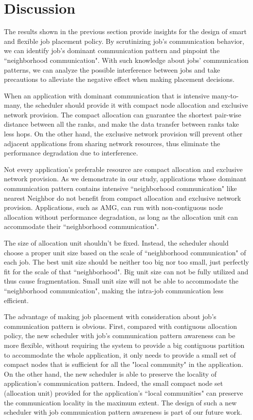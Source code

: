 
\section{Discussion}
\label{sec:discussion}

The results shown in the previous section provide insights 
for the design of smart and flexible job placement policy. 
By scrutinizing job's communication behavior, 
we can identify job's dominant communication pattern 
and pinpoint the ``neighborhood communication". 
With such knowledge about jobs' communication patterns, 
we can analyze the possible interference between jobs and 
take precautions to alleviate the negative effect when making placement decisions. 

When an application with dominant communication that is intensive many-to-many, 
the scheduler should provide it with compact node allocation and exclusive network provision. 
The compact allocation can guarantee the shortest pair-wise distance between all the ranks, 
and make the data transfer between ranks take less hops. 
On the other hand, 
the exclusive network provision will prevent other adjacent applications from sharing network resources, 
thus eliminate the performance degradation due to interference.

Not every application's preferable resource are compact allocation 
and exclusive network provision. 
As we demonstrate in our study, 
applications whose dominant communication pattern contains intensive 
``neighborhood communication" like nearest Neighbor do not benefit 
from compact allocation and exclusive network provision. 
Applications, such as AMG, can run with non-contiguous node 
allocation without performance degradation, 
as long as the allocation unit can accommodate their ``neighborhood communication".

The size of allocation unit shouldn't be fixed. 
Instead, the scheduler should choose a proper unit size 
based on the scale of ``neighborhood communication" of each job. 
The best unit size should be neither too big nor too small, 
just perfectly fit for the scale of that ``neighborhood". 
Big unit size can not be fully utilized and thus cause fragmentation. 
Small unit size will not be able to accommodate the ``neighborhood communication", 
making the intra-job communication less efficient. 


The advantage of making job placement with consideration about job's communication pattern is obvious. 
First, compared with contiguous allocation policy, 
the new scheduler with job's communication pattern awareness can be more flexible, 
without requiring the system to provide a big contiguous partition to accommodate the whole application, 
it only needs to provide a small set of compact nodes that is 
sufficient for all the "local community" in the application. 
On the other hand, 
the new scheduler is able to preserve the locality of application's communication pattern. 
Indeed, the small compact node set (allocation unit) provided for the application's 
``local communities" can preserve the communication locality in the maximum extent. 
The design of such a new scheduler with job communication pattern awareness 
is part of our future work. 




